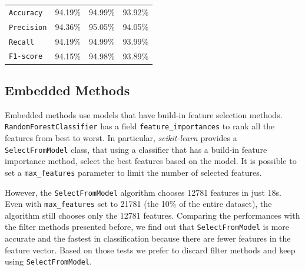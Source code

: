 \begin{table}[]
\begin{subtable}{\linewidth}
\begin{tabular}{llll}
		\texttt{Accuracy} & 94.19\% &  94.99\% &  93.92\% \\
		\texttt{Precision}  & 94.36\% & 95.05\% &   94.05\%   \\ 
		\texttt{Recall} & 94.19\%  &   94.99\%  & 93.99\% \\ 
		\texttt{F1-score}  &   94.15\%   & 94.98\% &    93.89\%      \\ 
		\bottomrule
	\end{tabular}
\end{subtable}
	
	
\end{table}


\subsection{Embedded Methods}

Embedded methods use models that have build-in feature selection methods. \texttt{RandomForestClassifier} has a field \texttt{feature\_importances} to rank all the features from best to worst. In particular, \textit{scikit-learn} provides a \texttt{SelectFromModel} class, that using a classifier that has a build-in feature importance method, select the best features based on the model. It is possible to set a \texttt{max\_features} parameter to limit the number of selected features.

However, the \texttt{SelectFromModel} algorithm chooses 12781 features in just 18s. Even with \texttt{max\_features} set to 21781 (the 10\% of the entire dataset), the algorithm still chooses only the 12781 features. Comparing the performances with the filter methods presented before, we find out that \texttt{SelectFromModel} is more accurate and the fastest in classification because there are fewer features in the feature vector. Based on those tests we prefer to discard filter methods and keep using \texttt{SelectFromModel}.

